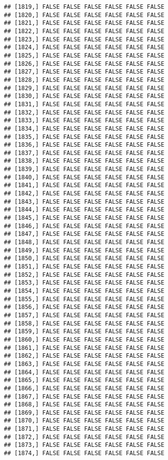 \documentclass[
]{article}
\begin{document}
\begin{verbatim}
## [1819,] FALSE FALSE FALSE FALSE FALSE FALSE
## [1820,] FALSE FALSE FALSE FALSE FALSE FALSE
## [1821,] FALSE FALSE FALSE FALSE FALSE FALSE
## [1822,] FALSE FALSE FALSE FALSE FALSE FALSE
## [1823,] FALSE FALSE FALSE FALSE FALSE FALSE
## [1824,] FALSE FALSE FALSE FALSE FALSE FALSE
## [1825,] FALSE FALSE FALSE FALSE FALSE FALSE
## [1826,] FALSE FALSE FALSE FALSE FALSE FALSE
## [1827,] FALSE FALSE FALSE FALSE FALSE FALSE
## [1828,] FALSE FALSE FALSE FALSE FALSE FALSE
## [1829,] FALSE FALSE FALSE FALSE FALSE FALSE
## [1830,] FALSE FALSE FALSE FALSE FALSE FALSE
## [1831,] FALSE FALSE FALSE FALSE FALSE FALSE
## [1832,] FALSE FALSE FALSE FALSE FALSE FALSE
## [1833,] FALSE FALSE FALSE FALSE FALSE FALSE
## [1834,] FALSE FALSE FALSE FALSE FALSE FALSE
## [1835,] FALSE FALSE FALSE FALSE FALSE FALSE
## [1836,] FALSE FALSE FALSE FALSE FALSE FALSE
## [1837,] FALSE FALSE FALSE FALSE FALSE FALSE
## [1838,] FALSE FALSE FALSE FALSE FALSE FALSE
## [1839,] FALSE FALSE FALSE FALSE FALSE FALSE
## [1840,] FALSE FALSE FALSE FALSE FALSE FALSE
## [1841,] FALSE FALSE FALSE FALSE FALSE FALSE
## [1842,] FALSE FALSE FALSE FALSE FALSE FALSE
## [1843,] FALSE FALSE FALSE FALSE FALSE FALSE
## [1844,] FALSE FALSE FALSE FALSE FALSE FALSE
## [1845,] FALSE FALSE FALSE FALSE FALSE FALSE
## [1846,] FALSE FALSE FALSE FALSE FALSE FALSE
## [1847,] FALSE FALSE FALSE FALSE FALSE FALSE
## [1848,] FALSE FALSE FALSE FALSE FALSE FALSE
## [1849,] FALSE FALSE FALSE FALSE FALSE FALSE
## [1850,] FALSE FALSE FALSE FALSE FALSE FALSE
## [1851,] FALSE FALSE FALSE FALSE FALSE FALSE
## [1852,] FALSE FALSE FALSE FALSE FALSE FALSE
## [1853,] FALSE FALSE FALSE FALSE FALSE FALSE
## [1854,] FALSE FALSE FALSE FALSE FALSE FALSE
## [1855,] FALSE FALSE FALSE FALSE FALSE FALSE
## [1856,] FALSE FALSE FALSE FALSE FALSE FALSE
## [1857,] FALSE FALSE FALSE FALSE FALSE FALSE
## [1858,] FALSE FALSE FALSE FALSE FALSE FALSE
## [1859,] FALSE FALSE FALSE FALSE FALSE FALSE
## [1860,] FALSE FALSE FALSE FALSE FALSE FALSE
## [1861,] FALSE FALSE FALSE FALSE FALSE FALSE
## [1862,] FALSE FALSE FALSE FALSE FALSE FALSE
## [1863,] FALSE FALSE FALSE FALSE FALSE FALSE
## [1864,] FALSE FALSE FALSE FALSE FALSE FALSE
## [1865,] FALSE FALSE FALSE FALSE FALSE FALSE
## [1866,] FALSE FALSE FALSE FALSE FALSE FALSE
## [1867,] FALSE FALSE FALSE FALSE FALSE FALSE
## [1868,] FALSE FALSE FALSE FALSE FALSE FALSE
## [1869,] FALSE FALSE FALSE FALSE FALSE FALSE
## [1870,] FALSE FALSE FALSE FALSE FALSE FALSE
## [1871,] FALSE FALSE FALSE FALSE FALSE FALSE
## [1872,] FALSE FALSE FALSE FALSE FALSE FALSE
## [1873,] FALSE FALSE FALSE FALSE FALSE FALSE
## [1874,] FALSE FALSE FALSE FALSE FALSE FALSE

\end{verbatim}
\end{document}
